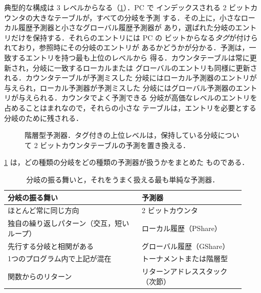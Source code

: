 \documentclass[../main.tex]{subfiles}
\begin{document}
典型的な構成は 3 レベルからなる（\cref{fig:l04-hierarchical}）．PC で
インデックスされる 2 ビットカウンタの大きなテーブルが，すべての分岐を予測
する．その上に，小さなローカル履歴予測器と小さなグローバル履歴予測器が
あり，選ばれた分岐のエントリだけを保持する．それらのエントリには PC の
ビットからなる\emph{タグ}が付けられており，参照時にその分岐のエントリが
あるかどうかが分かる．予測は，一致するエントリを持つ最も上位のレベルから
得る．カウンタテーブルは常に更新され，分岐に一致するローカルまたは
グローバルのエントリも同様に更新される．カウンタテーブルが予測ミスした
分岐にはローカル予測器のエントリが与えられ，ローカル予測器が予測ミスした
分岐にはグローバル予測器のエントリが与えられる．カウンタでよく予測できる
分岐が高価なレベルのエントリを占めることはまれなので，それらの小さな
テーブルは，エントリを必要とする分岐のために残される．

\begin{figure}[htbp]
  \centering
  
  \caption{階層型予測器．タグ付きの上位レベルは，保持している分岐について
    2 ビットカウンタテーブルの予測を置き換える．}
  \label{fig:l04-hierarchical}
\end{figure}

\cref{tab:l04-which} は，どの種類の分岐をどの種類の予測器が扱うかをまとめた
ものである．

\begin{table}[htbp]
  \centering\small
  \caption{分岐の振る舞いと，それをうまく扱える最も単純な予測器．}
  \label{tab:l04-which}
  \begin{tabular}{@{}p{0.52\linewidth}p{0.4\linewidth}@{}}
    \toprule
    分岐の振る舞い & 予測器 \\
    \midrule
    ほとんど常に同じ方向 & 2 ビットカウンタ \\
    独自の繰り返しパターン（交互，短いループ） & ローカル履歴（PShare） \\
    先行する分岐と相関がある & グローバル履歴（GShare） \\
    1つのプログラム内で上記が混在 & トーナメントまたは階層型 \\
    関数からのリターン & リターンアドレススタック（次節） \\
    \bottomrule
  \end{tabular}
\end{table}
\end{document}
